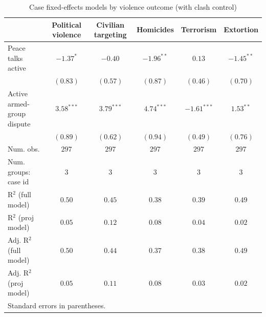 
\begin{table}
\caption{Case fixed-effects models by violence outcome (with clash control)}
\begin{center}
\begin{tabular}{l c c c c c}
\toprule
 & Political violence & Civilian targeting & Homicides & Terrorism & Extortion \\
\midrule
Peace talks active         & $-1.37^{*}$  & $-0.40$      & $-1.96^{**}$ & $0.13$        & $-1.45^{**}$ \\
                           & $(0.83)$     & $(0.57)$     & $(0.87)$     & $(0.46)$      & $(0.70)$     \\
Active armed-group dispute & $3.58^{***}$ & $3.79^{***}$ & $4.74^{***}$ & $-1.61^{***}$ & $1.53^{**}$  \\
                           & $(0.89)$     & $(0.62)$     & $(0.94)$     & $(0.49)$      & $(0.76)$     \\
\midrule
Num. obs.                  & $297$        & $297$        & $297$        & $297$         & $297$        \\
Num. groups: case id      & $3$          & $3$          & $3$          & $3$           & $3$          \\
R$^2$ (full model)         & $0.50$       & $0.45$       & $0.38$       & $0.39$        & $0.49$       \\
R$^2$ (proj model)         & $0.05$       & $0.12$       & $0.08$       & $0.04$        & $0.02$       \\
Adj. R$^2$ (full model)    & $0.50$       & $0.44$       & $0.37$       & $0.38$        & $0.49$       \\
Adj. R$^2$ (proj model)    & $0.05$       & $0.11$       & $0.08$       & $0.03$        & $0.02$       \\
\bottomrule
\multicolumn{6}{l}{\scriptsize{Standard errors in parentheses.}}
\end{tabular}
\label{tab:violence_case_fe}
\end{center}
\end{table}
